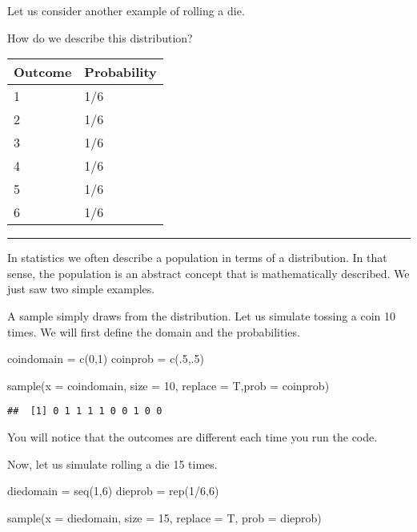 \documentclass[
]{article}
\newenvironment{Shaded}{\begin{snugshade}}{\end{snugshade}}
\newcommand{\AttributeTok}[1]{\textcolor[rgb]{0.77,0.63,0.00}{#1}}
\newcommand{\DecValTok}[1]{\textcolor[rgb]{0.00,0.00,0.81}{#1}}
\newcommand{\FunctionTok}[1]{\textcolor[rgb]{0.00,0.00,0.00}{#1}}
\newcommand{\NormalTok}[1]{#1}
\newcommand{\OtherTok}[1]{\textcolor[rgb]{0.56,0.35,0.01}{#1}}
\newcommand{\SpecialCharTok}[1]{\textcolor[rgb]{0.00,0.00,0.00}{#1}}
\begin{document}
Let us consider another example of rolling a die.

How do we describe this distribution?

\begin{longtable}[]{@{}ll@{}}
\toprule()
Outcome & Probability \\
\midrule()
\endhead
1 & 1/6 \\
2 & 1/6 \\
3 & 1/6 \\
4 & 1/6 \\
5 & 1/6 \\
6 & 1/6 \\
\bottomrule()
\end{longtable}

\begin{center}\rule{0.5\linewidth}{0.5pt}\end{center}

In statistics we often describe a population in terms of a distribution.
In that sense, the population is an abstract concept that is
mathematically described. We just saw two simple examples.

A sample simply draws from the distribution. Let us simulate tossing a
coin 10 times. We will first define the domain and the probabilities.

\begin{Shaded}
\begin{Highlighting}[]
\NormalTok{coindomain }\OtherTok{=} \FunctionTok{c}\NormalTok{(}\DecValTok{0}\NormalTok{,}\DecValTok{1}\NormalTok{)}
\NormalTok{coinprob }\OtherTok{=} \FunctionTok{c}\NormalTok{(.}\DecValTok{5}\NormalTok{,.}\DecValTok{5}\NormalTok{)}

\FunctionTok{sample}\NormalTok{(}\AttributeTok{x =}\NormalTok{ coindomain, }\AttributeTok{size =} \DecValTok{10}\NormalTok{, }\AttributeTok{replace =}\NormalTok{ T,}\AttributeTok{prob =}\NormalTok{ coinprob)}
\end{Highlighting}
\end{Shaded}

\begin{verbatim}
##  [1] 0 1 1 1 1 0 0 1 0 0
\end{verbatim}

You will notice that the outcomes are different each time you run the
code.

Now, let us simulate rolling a die 15 times.

\begin{Shaded}
\begin{Highlighting}[]
\NormalTok{diedomain }\OtherTok{=} \FunctionTok{seq}\NormalTok{(}\DecValTok{1}\NormalTok{,}\DecValTok{6}\NormalTok{)}
\NormalTok{dieprob }\OtherTok{=} \FunctionTok{rep}\NormalTok{(}\DecValTok{1}\SpecialCharTok{/}\DecValTok{6}\NormalTok{,}\DecValTok{6}\NormalTok{)}

\FunctionTok{sample}\NormalTok{(}\AttributeTok{x =}\NormalTok{ diedomain, }\AttributeTok{size =} \DecValTok{15}\NormalTok{, }\AttributeTok{replace =}\NormalTok{ T, }\AttributeTok{prob =}\NormalTok{ dieprob)}
\end{Highlighting}
\end{Shaded}
\end{document}
